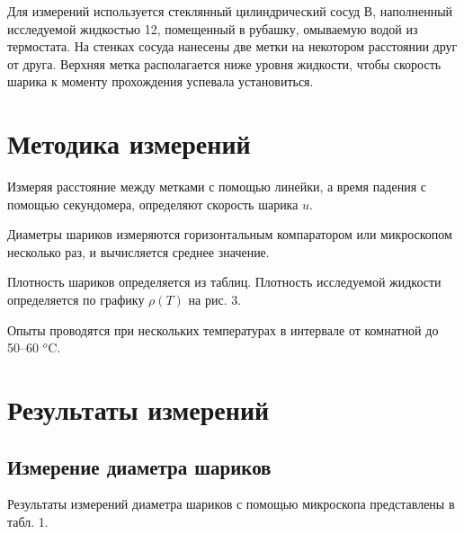 \documentclass{article}
\begin{document}
	
	Для измерений используется стеклянный цилиндрический сосуд В, наполненный исследуемой жидкостью 12, помещенный в рубашку, омываемую водой из термостата. На стенках сосуда нанесены две метки на некотором расстоянии друг от друга. Верхняя метка располагается ниже уровня жидкости, чтобы скорость шарика к моменту прохождения успевала установиться.
	
	
	\section*{Методика измерений}
	
	\hspace{4mm} Измеряя расстояние между метками с помощью линейки, а время падения с помощью секундомера, определяют скорость шарика $u$.
	
	
	Диаметры шариков измеряются горизонтальным компаратором
	или микроскопом несколько раз, и вычисляется среднее значение.
	
	
	Плотность шариков определяется из таблиц. Плотность исследуемой жидкости определяется
	по графику $\rho(T)$ на рис. 3.
	
	
	Опыты проводятся при нескольких температурах в интервале от
	комнатной до 50–60 $^o$C.

	
\section*{Результаты измерений}

\subsection*{Измерение диаметра шариков}

	\hspace{4mm} Результаты измерений диаметра шариков с помощью микроскопа представлены в табл. 1.
\end{document}
